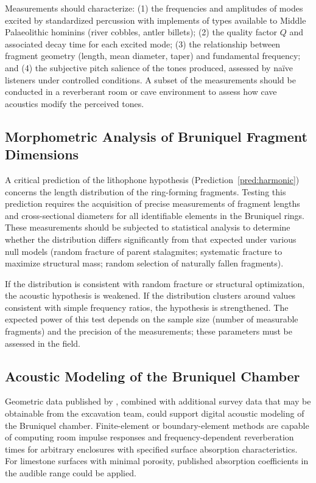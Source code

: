 \documentclass[12pt]{article}
\begin{document}
Measurements should characterize: (1) the frequencies and amplitudes of modes excited by standardized percussion with implements of types available to Middle Palaeolithic hominins (river cobbles, antler billets); (2) the quality factor $Q$ and associated decay time for each excited mode; (3) the relationship between fragment geometry (length, mean diameter, taper) and fundamental frequency; and (4) the subjective pitch salience of the tones produced, assessed by naïve listeners under controlled conditions. A subset of the measurements should be conducted in a reverberant room or cave environment to assess how cave acoustics modify the perceived tones.

\subsection{Morphometric Analysis of Bruniquel Fragment Dimensions}

A critical prediction of the lithophone hypothesis (Prediction~\ref{pred:harmonic}) concerns the length distribution of the ring-forming fragments. Testing this prediction requires the acquisition of precise measurements of fragment lengths and cross-sectional diameters for all identifiable elements in the Bruniquel rings. These measurements should be subjected to statistical analysis to determine whether the distribution differs significantly from that expected under various null models (random fracture of parent stalagmites; systematic fracture to maximize structural mass; random selection of naturally fallen fragments).

If the distribution is consistent with random fracture or structural optimization, the acoustic hypothesis is weakened. If the distribution clusters around values consistent with simple frequency ratios, the hypothesis is strengthened. The expected power of this test depends on the sample size (number of measurable fragments) and the precision of the measurements; these parameters must be assessed in the field.

\subsection{Acoustic Modeling of the Bruniquel Chamber}

Geometric data published by \citet{Jaubert2016}, combined with additional survey data that may be obtainable from the excavation team, could support digital acoustic modeling of the Bruniquel chamber. Finite-element or boundary-element methods are capable of computing room impulse responses and frequency-dependent reverberation times for arbitrary enclosures with specified surface absorption characteristics. For limestone surfaces with minimal porosity, published absorption coefficients in the audible range could be applied.
\end{document}
